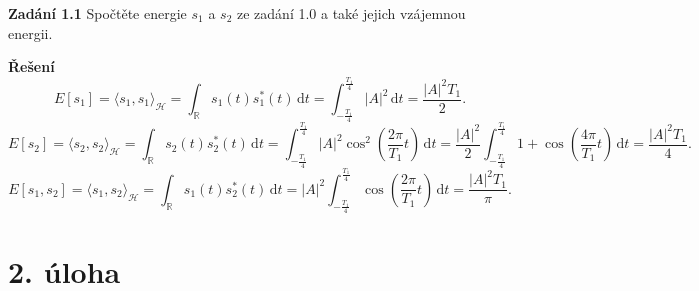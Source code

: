 \documentclass{article}
\begin{document}
\vspace{0.5em}
\noindent \textbf{Zadání 1.1} Spočtěte energie $s_1$ a $s_2$ ze zadání 1.0 a také jejich vzájemnou energii.

\vspace{0.5em}
\noindent\textbf{Řešení}
\[
    E[s_1] = \langle s_1, s_1 \rangle_{\mathcal{H}} = \int_{\mathbb{R}}s_1(t) s_1^{*}(t)\,\mathrm{d}t = \int_{-\frac{T_1}{4}}^{\frac{T_1}{4}} |A|^2 \,\mathrm{d}t = \frac{|A|^2T_1}{2}.
\]
\[
    E[s_2] = \langle s_2, s_2 \rangle_{\mathcal{H}} = \int_{\mathbb{R}}s_2(t) s_2^{*}(t)\,\mathrm{d}t = \int_{-\frac{T_1}{4}}^{\frac{T_1}{4}} |A|^2 \cos^2\left(\frac{2\pi}{T_1} t \right) \,\mathrm{d}t = \frac{|A|^2}{2} \int_{-\frac{T_1}{4}}^{\frac{T_1}{4}} 1 + \cos\left(\frac{4\pi}{T_1}t \right)\,\mathrm{d}t = \frac{|A|^2T_1}{4}.
\]
\[
    E[s_1, s_2] = \langle s_1, s_2 \rangle_{\mathcal{H}} = \int_{\mathbb{R}}s_1(t) s_2^{*}(t)\,\mathrm{d}t =|A|^2 \int_{-\frac{T_1}{4}}^{\frac{T_1}{4}} \cos\left( \frac{2\pi}{T_1}t\right)\,\mathrm{d}t = \frac{|A|^2T_1}{\pi}.
\]

\newpage

\section*{2. úloha}
\end{document}
